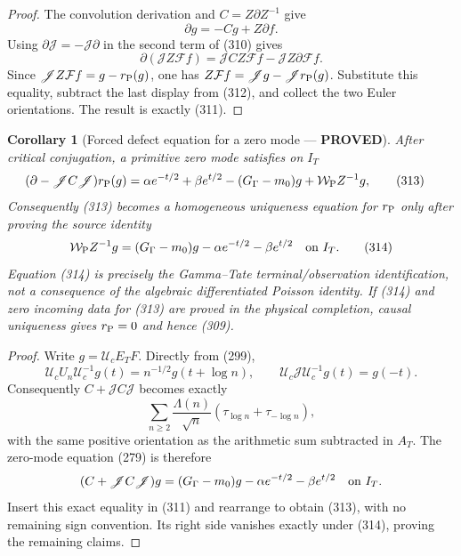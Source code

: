 \documentclass[11pt]{article}
\newtheorem{corollary}[theorem]{Corollary}
\newcommand{\PROVED}{\textcolor{green!45!black}{\textbf{PROVED}}}
\begin{document}
\begin{proof}
The convolution derivation and
$C=Z\partial Z^{-1}$ give
\begin{equation}
 \partial g=-Cg+Z\partial f.                          \tag{312}
\end{equation}
Using $\partial\mathscr J=-\mathscr J\partial$ in the second term of (310)
gives
\[
 \partial(\mathscr JZ\mathcal Ff)
 =\mathscr JCZ\mathcal Ff-\mathscr JZ\partial\mathcal Ff.
\]
Since $\mathscr JZ\mathcal Ff=g-r_{\rm P}(g)$, one has
$Z\mathcal Ff=\mathscr Jg-\mathscr Jr_{\rm P}(g)$.
Substitute this equality, subtract the last display from (312), and collect
the two Euler orientations.  The result is exactly (311).
\end{proof}

\begin{corollary}[Forced defect equation for a zero mode --- \PROVED]
After critical conjugation, a primitive zero mode satisfies on $I_T$
\begin{align}
 (\partial-\mathscr JC\mathscr J)r_{\rm P}(g)
 ={}&\alpha e^{-t/2}+\beta e^{t/2}
      -(G_\Gamma-m_0)g+\mathcal W_{\rm P}Z^{-1}g,
                                                               \tag{313}
\end{align}
Consequently (313) becomes a homogeneous uniqueness equation for
$r_{\rm P}$ only after proving the source identity
\begin{equation}
 \mathcal W_{\rm P}Z^{-1}g
 =(G_\Gamma-m_0)g-\alpha e^{-t/2}-\beta e^{t/2}
 \quad\hbox{on }I_T.                                  \tag{314}
\end{equation}
Equation (314) is precisely the Gamma--Tate terminal/observation
identification, not a consequence of the algebraic differentiated Poisson
identity.  If (314) and zero incoming data for (313) are proved in the
physical completion, causal uniqueness gives $r_{\rm P}=0$ and hence (309).
\end{corollary}

\begin{proof}
Write $g=\mathcal U_cE_TF$.  Directly from (299),
\[
 \mathcal U_cU_n\mathcal U_c^{-1}g(t)
 =n^{-1/2}g(t+\log n),
 \qquad
 \mathcal U_c\mathscr J\mathcal U_c^{-1}g(t)=g(-t).
\]
Consequently $C+\mathscr JC\mathscr J$ becomes exactly
\[
 \sum_{n\ge2}\frac{\Lambda(n)}{\sqrt n}
   (\tau_{\log n}+\tau_{-\log n}),
\]
with the same positive orientation as the arithmetic sum subtracted in
$A_T$.  The zero-mode equation (279) is therefore
\[
 (C+\mathscr JC\mathscr J)g
 =(G_\Gamma-m_0)g-\alpha e^{-t/2}-\beta e^{t/2}
 \quad\hbox{on }I_T.
\]
Insert this exact equality in (311) and rearrange to obtain (313), with no
remaining sign convention.  Its right side vanishes exactly under (314),
proving the remaining claims.
\end{proof}
\end{document}
